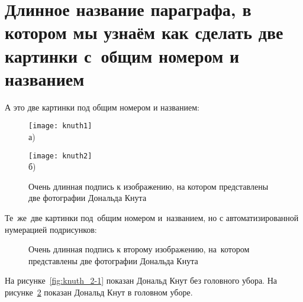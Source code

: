 \section{Длинное название параграфа, в котором мы узнаём как сделать две картинки с~общим номером и названием}\label{sec:ch2/sect2}

А это две картинки под общим номером и названием:
\begin{figure}[ht]
    \begin{minipage}[b][][b]{0.49\linewidth}\centering
        \texttt{[image: knuth1]} \\ а)
    \end{minipage}
    \hfill
    \begin{minipage}[b][][b]{0.49\linewidth}\centering
        \texttt{[image: knuth2]} \\ б)
    \end{minipage}
    \caption{Очень длинная подпись к изображению,
        на котором представлены две фотографии Дональда Кнута}
    \label{fig:knuth}
\end{figure}

Те~же~две картинки под~общим номером и~названием,
но с автоматизированной нумерацией подрисунков:
\begin{figure}[ht]
    \caption[Этот текст попадает в названия рисунков в списке рисунков]{Очень
        длинная подпись к второму изображению, на~котором представлены две
        фотографии Дональда Кнута}\label{fig:knuth_2}
\end{figure}

На рисунке~\cref{fig:knuth_2-1} показан Дональд Кнут без головного убора.
На рисунке~\cref{fig:knuth_2}
показан Дональд Кнут в головном уборе.

